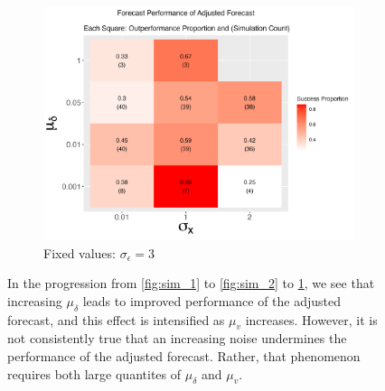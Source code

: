 \documentclass[11pt]{article}
\theoremstyle{definition}
\begin{document}
\begin{figure}[!h]
  \begin{subfigure}{.44\linewidth} 
    \centering
      \includegraphics[scale=.42]{simulation_plots/Nov27_160343_2024_mudelta_sigmax.png}
      \caption{Fixed values: $\sigma_{\epsilon}=3$}\label{fig:sim_3}
  \end{subfigure}
  
      \caption{In the progression from \ref{fig:sim_1} to \ref{fig:sim_2} to \ref{fig:sim_3}, we see that increasing $\mu_{\delta}$ leads to improved performance of the adjusted forecast, and this effect is intensified as $\mu_{v}$ increases.  However, it is not consistently true that an increasing noise undermines the performance of the adjusted forecast.  Rather, that phenomenon requires both large quantites of $\mu_{\delta}$ and $\mu_{v}$.}
      \label{fig:set_of_three_one}
    \end{figure}
  
\end{document}
